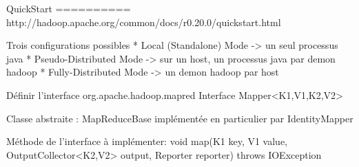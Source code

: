 QuickStart
==========
http://hadoop.apache.org/common/docs/r0.20.0/quickstart.html

Trois configurations possibles
* Local (Standalone) Mode  -> un seul processus java
* Pseudo-Distributed Mode  -> sur un host, un processus java par demon hadoop
* Fully-Distributed Mode   -> un demon hadoop par host


Définir l'interface 
   org.apache.hadoop.mapred
       Interface Mapper<K1,V1,K2,V2>

Classe abstraite : MapReduceBase
   implémentée en particulier par IdentityMapper


Méthode de l'interface à implémenter: 
void map(K1 key,
         V1 value,
         OutputCollector<K2,V2> output,
         Reporter reporter)
         throws IOException









